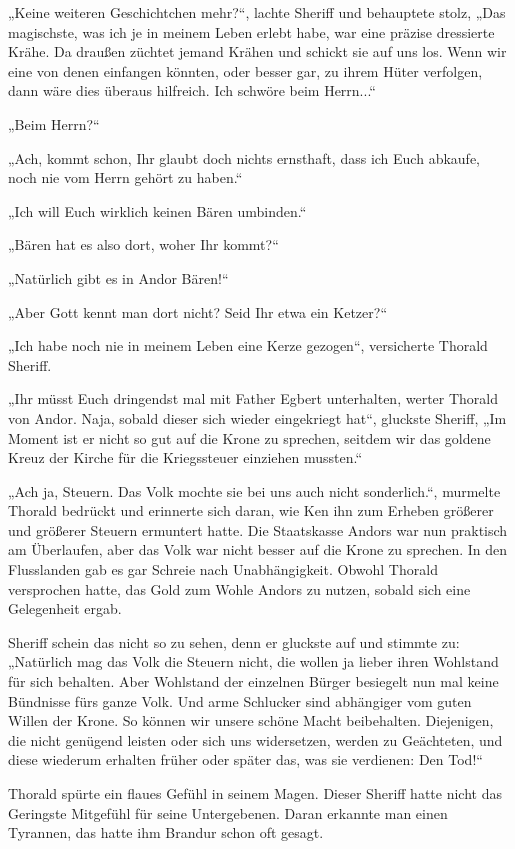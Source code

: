 „Keine weiteren Geschichtchen mehr?“, lachte Sheriff und behauptete stolz, „Das magischste, was ich je in meinem Leben erlebt habe, war eine präzise dressierte Krähe. Da draußen züchtet jemand Krähen und schickt sie auf uns los. Wenn wir eine von denen einfangen könnten, oder besser gar, zu ihrem Hüter verfolgen, dann wäre dies überaus hilfreich. Ich schwöre beim Herrn...“

„Beim Herrn?“

„Ach, kommt schon, Ihr glaubt doch nichts ernsthaft, dass ich Euch abkaufe, noch nie vom Herrn gehört zu haben.“

„Ich will Euch wirklich keinen Bären umbinden.“

„Bären hat es also dort, woher Ihr kommt?“

„Natürlich gibt es in Andor Bären!“

„Aber Gott kennt man dort nicht? Seid Ihr etwa ein Ketzer?“

„Ich habe noch nie in meinem Leben eine Kerze gezogen“, versicherte Thorald Sheriff.

„Ihr müsst Euch dringendst mal mit Father Egbert unterhalten, werter Thorald von Andor. Naja, sobald dieser sich wieder eingekriegt hat“, gluckste Sheriff, „Im Moment ist er nicht so gut auf die Krone zu sprechen, seitdem wir das goldene Kreuz der Kirche für die Kriegssteuer einziehen mussten.“

„Ach ja, Steuern. Das Volk mochte sie bei uns auch nicht sonderlich.“, murmelte Thorald bedrückt und erinnerte sich daran, wie Ken ihn zum Erheben größerer und größerer Steuern ermuntert hatte. Die Staatskasse Andors war nun praktisch am Überlaufen, aber das Volk war nicht besser auf die Krone zu sprechen. In den Flusslanden gab es gar Schreie nach Unabhängigkeit. Obwohl Thorald versprochen hatte, das Gold zum Wohle Andors zu nutzen, sobald sich eine Gelegenheit ergab.

Sheriff schein das nicht so zu sehen, denn er gluckste auf und stimmte zu: „Natürlich mag das Volk die Steuern nicht, die wollen ja lieber ihren Wohlstand für sich behalten. Aber Wohlstand der einzelnen Bürger besiegelt nun mal keine Bündnisse fürs ganze Volk. Und arme Schlucker sind abhängiger vom guten Willen der Krone. So können wir unsere schöne Macht beibehalten. Diejenigen, die nicht genügend leisten oder sich uns widersetzen, werden zu Geächteten, und diese wiederum erhalten früher oder später das, was sie verdienen: Den Tod!“

Thorald spürte ein flaues Gefühl in seinem Magen. Dieser Sheriff hatte nicht das Geringste Mitgefühl für seine Untergebenen. Daran erkannte man einen Tyrannen, das hatte ihm Brandur schon oft gesagt.

